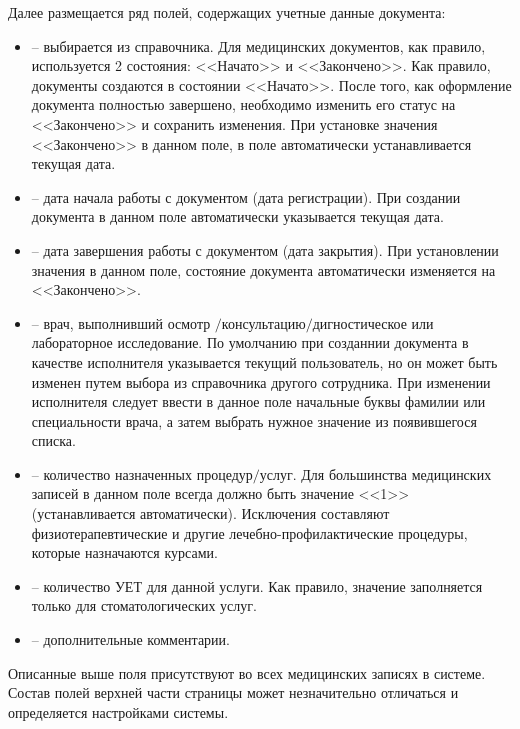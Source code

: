 {Далее размещается ряд полей, содержащих учетные данные документа: 
\begin{itemize}
 \item {} -- выбирается из справочника. Для медицинских документов, как правило, используется 2 состояния: <<Начато>> и <<Закончено>>. Как правило, документы создаются в состоянии <<Начато>>. После того, как оформление документа полностью завершено, необходимо изменить его статус на <<Закончено>> и сохранить изменения. При установке значения <<Закончено>> в данном поле, в поле  автоматически устанавливается текущая дата. 
 \item {} -- дата начала работы с документом (дата регистрации). При создании документа в данном поле автоматически указывается текущая дата.
 \item {} -- дата завершения работы с документом (дата закрытия). При установлении значения в данном поле, состояние документа автоматически изменяется на <<Закончено>>. 
 \item {} -- врач, выполнивший осмотр $\slash$консультацию$\slash$дигностическое или лабораторное исследование. По умолчанию при созданнии документа в качестве исполнителя указывается текущий пользователь, но он может быть изменен путем выбора из справочника другого сотрудника. При изменении исполнителя следует ввести в данное поле начальные буквы фамилии или специальности врача, а затем выбрать нужное значение из появившегося списка.   
 \item {} -- количество назначенных процедур$\slash$услуг. Для большинства медицинских записей в данном поле всегда должно быть значение <<1>> (устанавливается автоматически). Исключения составляют физиотерапевтические и другие лечебно-профилактические процедуры, которые назначаются курсами. 
 \item {} -- количество УЕТ для данной услуги. Как правило, значение заполняется только для стоматологических услуг.
 \item {} -- дополнительные комментарии.
\end{itemize}

Описанные выше поля присутствуют во всех медицинских записях в системе. Состав полей верхней части страницы может незначительно отличаться и определяется настройками системы.

}
